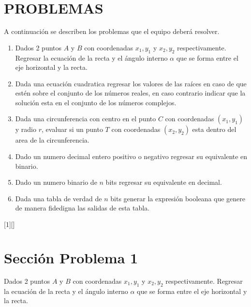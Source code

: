 \documentclass{IEEEcsmag}
\begin{document}
\section{PROBLEMAS}
A continuación se describen los problemas que el equipo deberá resolver.
\begin{enumerate}
\item Dados 2 puntos $A \mbox{ y } B$ con coordenadas $x_{1}, y_{1}$ y $x_{2}, y_{2}$  respectivamente. Regresar la ecuación de la recta y el ángulo interno $\alpha$ que se forma entre el eje horizontal y la recta. 
\item Dada una ecuación cuadratica regresar los valores de las raíces en caso de que estén sobre el conjunto de los números reales, en caso contrario indicar que la solución esta en el conjunto de los números complejos. 
\item Dada una circunferencia con centro en el punto $C$ con coordenadas $(x_{1}, y_{1})$ y radio $r$, evaluar si un punto $T$ con coordenadas $(x_{2}, y_{2})$ esta dentro del area de la circunferencia.
\item Dado un numero decimal entero positivo o negativo regresar su equivalente en binario.
\item Dado un numero binario de $n$ bits regresar su equivalente en decimal.
\item Dada una tabla de verdad de $n$ bits generar la expresión booleana que genere de manera fidedigna las salidas de esta tabla.
\end{enumerate}
[1][]
{}
{}

\section{Sección Problema 1}
\item Dados 2 puntos $A \mbox{ y } B$ con coordenadas $x_{1}, y_{1}$ y $x_{2}, y_{2}$  respectivamente. Regresar la ecuación de la recta y el ángulo interno $\alpha$ que se forma entre el eje horizontal y la recta.
\end{document}
